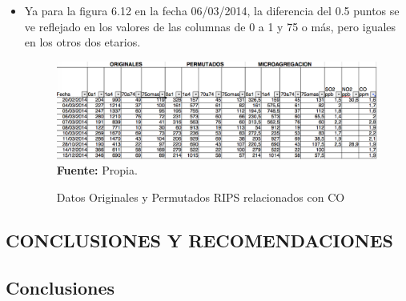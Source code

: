 \documentclass[a4paper,openright,12pt]{book}
\theoremstyle{definition}
\theoremstyle{remark}
\begin{document}
\begin{itemize}
    \item Ya para la figura 6.12 en la fecha 06/03/2014, la diferencia del 0.5 puntos se ve reflejado en los valores de las columnas de 0 a 1 y 75 o más, pero iguales en los otros dos etarios.
\begin{figure}[h]
\centering
\caption{Datos Originales y Permutados RIPS relacionados con CO} 
\includegraphics[scale=0.45]{Puente_Aranda/CO_Puente_Aranda}
\label{fig:Tabla1}
\\ \textbf{Fuente: }Propia.
\end{figure}
\end{itemize}

\begin{center}
 \chapter{CONCLUSIONES Y RECOMENDACIONES}\label{cap.conclusiones}
\end{center}

\section{Conclusiones}
\end{document}
